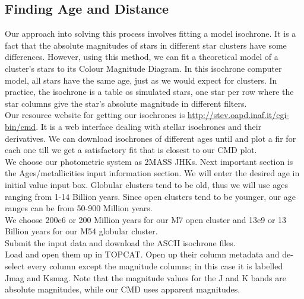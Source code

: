 \documentclass[12pt]{article}
\begin{document}
		\subsection{Finding Age and Distance}
		Our approach into solving this process involves fitting a model isochrone. It is a fact that the absolute magnitudes of stars in different star clusters have some differences. However, using this method, we can fit a theoretical model of a cluster's stars to its Colour Magnitude Diagram. In this isochrone computer model, all stars have the same age, just as we would expect for clusters. In practice, the isochrone is a table os simulated stars, one star per row where the star columns give the star's absolute magnitude in different filters.\\
		Our resource website for getting our isochrones is \url{http://stev.oapd.inaf.it/cgi-bin/cmd}. It is a web interface dealing with stellar isochrones and their derivatives. We can download isochrones of different ages until and plot a fir for each one till we get a satisfactory fit that is closest to our CMD plot.\\
		We choose our photometric system as 2MASS JHKs. Next important section is the Ages/metallicities input information section. We will enter the desired age in initial value input box. Globular clusters tend to be old, thus we will use ages ranging from 1-14 Billion years. Since open clusters tend to be younger, our age ranges can be from 50-900 Million years.\\
		We choose 200e6 or 200 Million years for our M7 open cluster and 13e9 or 13 Billion years for our M54 globular cluster.\\
		Submit the input data and download the ASCII isochrone files.\\
		Load and open them up in TOPCAT. Open up their column metadata and de-select every column except the magnitude columns; in this case it is labelled Jmag and Ksmag. Note that the magnitude values for the J and K bands are absolute magnitudes, while our CMD uses apparent magnitudes.
\end{document}
